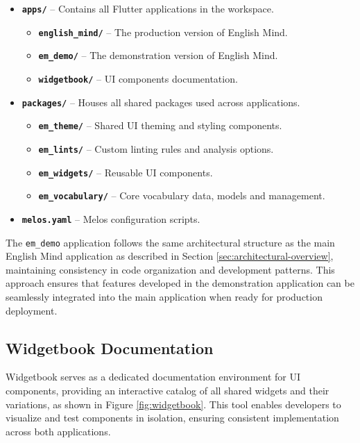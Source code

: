 \begin{itemize}
    \item \textbf{\texttt{apps/}} – Contains all Flutter applications in the workspace.
    \begin{itemize}
        \item \textbf{\texttt{english\_mind/}} – The production version of English Mind.
        \item \textbf{\texttt{em\_demo/}} – The demonstration version of English Mind.
        \item \textbf{\texttt{widgetbook/}} – UI components documentation.
    \end{itemize}

    \item \textbf{\texttt{packages/}} – Houses all shared packages used across applications.
    \begin{itemize}
        \item \textbf{\texttt{em\_theme/}} – Shared UI theming and styling components.
        \item \textbf{\texttt{em\_lints/}} – Custom linting rules and analysis options.
        \item \textbf{\texttt{em\_widgets/}} – Reusable UI components.
        \item \textbf{\texttt{em\_vocabulary/}} – Core vocabulary data, models and management.
    \end{itemize}

    \item \textbf{\texttt{melos.yaml}} – Melos configuration scripts.
\end{itemize}

The \texttt{em\_demo} application follows the same architectural structure as the main English Mind application as described in Section \ref{sec:architectural-overview}, maintaining consistency in code organization and development patterns. This approach ensures that features developed in the demonstration application can be seamlessly integrated into the main application when ready for production deployment.

\subsection{Widgetbook Documentation}

Widgetbook \cite{cite:widgetbook} serves as a dedicated documentation environment for UI components, providing an interactive catalog of all shared widgets and their variations, as shown in Figure \ref{fig:widgetbook}. This tool enables developers to visualize and test components in isolation, ensuring consistent implementation across both applications. 

